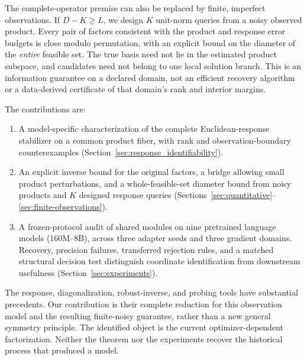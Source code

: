 The complete-operator premise can also be replaced by finite, imperfect
observations. If $D-K\ge L$, we design $K$ unit-norm queries from a noisy
observed product. Every pair of factors consistent with the product and
response error budgets is close modulo permutation, with an explicit bound
on the diameter of the \emph{entire} feasible set. The true basis need not
lie in the estimated product subspace, and candidates need not belong to one
local solution branch. This is an information guarantee on a declared domain,
not an efficient recovery algorithm or a data-derived certificate of that
domain's rank and interior margins.

The contributions are:
\begin{enumerate}
\item A model-specific characterization of the complete Euclidean-response
stabilizer on a common product fiber, with rank and observation-boundary
counterexamples (Section~\ref{sec:response_identifiability}).
\item An explicit inverse bound for the original factors, a bridge allowing
small product perturbations, and a whole-feasible-set diameter bound from
noisy products and $K$ designed response queries
(Sections~\ref{sec:quantitative}--\ref{sec:finite-observations}).
\item A frozen-protocol audit of shared modules on nine pretrained language
models (160M--8B), across three adapter seeds and three gradient domains.
Recovery, precision failures, transferred rejection rules, and a matched
structural decision test distinguish coordinate identification from
downstream usefulness (Section~\ref{sec:experiments}).
\end{enumerate}

The response, diagonalization, robust-inverse, and probing tools have
substantial precedents. Our contribution is their complete reduction for
this observation model and the resulting finite-noisy guarantee, rather
than a new general symmetry principle. The identified object is the current
optimizer-dependent factorization. Neither the theorem nor the experiments
recover the historical process that produced a model.
